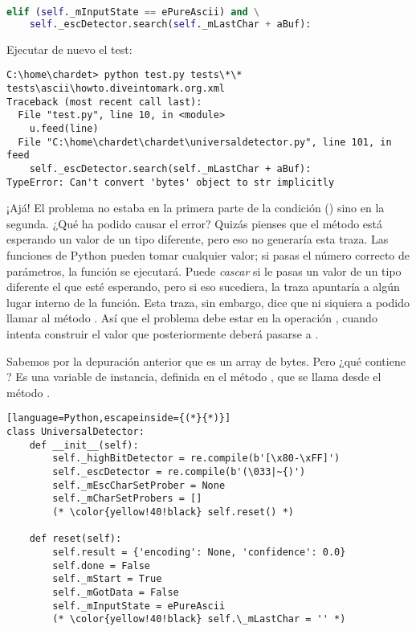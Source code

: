 \begin{lstlisting}[language=Python,breaklines=true]
elif (self._mInputState == ePureAscii) and \
    self._escDetector.search(self._mLastChar + aBuf):
\end{lstlisting}

Ejecutar de nuevo el test:


\noindent\begin{minipage}{\textwidth}
\begin{lstlisting}[breaklines=true]
C:\home\chardet> python test.py tests\*\*
tests\ascii\howto.diveintomark.org.xml
Traceback (most recent call last):
  File "test.py", line 10, in <module>
    u.feed(line)
  File "C:\home\chardet\chardet\universaldetector.py", line 101, in feed
    self._escDetector.search(self._mLastChar + aBuf):
TypeError: Can't convert 'bytes' object to str implicitly
\end{lstlisting}
\end{minipage}

¡Ajá! El problema no estaba  en la primera parte de la condición () sino en la segunda. ¿Qué ha podido causar el error? Quizás pienses que el método  está esperando un valor de un tipo diferente, pero eso no generaría esta traza. Las funciones de Python pueden tomar cualquier valor; si pasas el número correcto de parámetros, la función se ejecutará. Puede \emph{cascar} si le pasas un valor de un tipo diferente el que esté esperando, pero si eso sucediera, la traza apuntaría a algún lugar interno de la función. Esta traza, sin embargo, dice que ni siquiera a podido llamar al método . Así que el problema debe estar en la operación \codigo{+}, cuando intenta construir el valor que posteriormente deberá pasarse a .

Sabemos por la depuración anterior que  es un array de bytes. Pero ¿qué contiene ? Es una variable de instancia, definida en el método , que se llama desde el método .


\begin{lstlisting}[language=Python,escapeinside={(*}{*)}]
class UniversalDetector:
    def __init__(self):
        self._highBitDetector = re.compile(b'[\x80-\xFF]')
        self._escDetector = re.compile(b'(\033|~{)')
        self._mEscCharSetProber = None
        self._mCharSetProbers = []
        (* \color{yellow!40!black} self.reset() *)

    def reset(self):
        self.result = {'encoding': None, 'confidence': 0.0}
        self.done = False
        self._mStart = True
        self._mGotData = False
        self._mInputState = ePureAscii
        (* \color{yellow!40!black} self.\_mLastChar = '' *)
\end{lstlisting}

